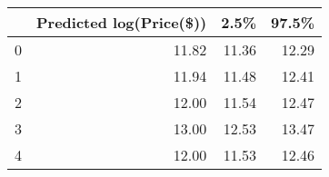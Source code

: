 \begin{tabular}{lrrr}
\toprule
{} &  Predicted log(Price(\$)) &  2.5\% &  97.5\% \\
\midrule
0 &                    11.82 & 11.36 &  12.29 \\
1 &                    11.94 & 11.48 &  12.41 \\
2 &                    12.00 & 11.54 &  12.47 \\
3 &                    13.00 & 12.53 &  13.47 \\
4 &                    12.00 & 11.53 &  12.46 \\
\bottomrule
\end{tabular}
